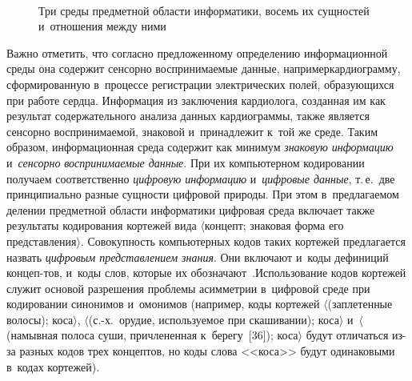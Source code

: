 \begin{multicols}{2}
  \begin{figure*}[b] %
  \vspace*{1pt}
\begin{center}
   \mbox{%
\epsfxsize=163mm
}

\vspace*{6pt}

{\small Три среды предметной области информатики, восемь их сущностей и~отношения 
между ними
  }
  \end{center}
  \end{figure*}
  
  Важно отметить, что согласно предложенному определению 
информационной среды она содержит сенсорно воспринимаемые данные, 
например\linebreak кардиограмму, сформированную в~процессе ре\-гист\-ра\-ции 
электрических полей, образующихся при работе сердца. Информация из 
заключения кардиолога, созданная им как результат \mbox{содержательного} анализа 
данных кардиограммы, также является сенсорно воспринимаемой, знаковой 
и~принадлежит к~той же среде. Таким образом, информационная среда 
содержит как минимум \textit{знаковую информацию} и~\textit{сенсорно} 
\textit{воспринимаемые данные}. При их компьютерном кодировании получаем 
соответственно \textit{цифровую информацию} и~\textit{цифровые данные}, т.\,е.\
 две принципиально разные сущности циф\-ро\-вой природы. При этом 
в~предлагаемом делении предметной об\-ласти информатики цифровая среда 
включает также результаты кодирования кортежей вида $\langle$концепт; 
знаковая форма его представления$\rangle$. Совокупность компьютерных 
кодов таких кортежей предлагается назвать \textit{цифровым представлением 
знания}. Они включают и~коды дефиниций концеп-\linebreak тов, и~коды слов, которые их 
обозначают~\cite{35-zac}.\linebreak Использование кодов кортежей служит основой 
разрешения проблемы асимметрии в~цифровой среде при кодировании 
синонимов и~омонимов (например, коды кортежей $\langle$(заплетенные 
волосы); коса$\rangle$, $\langle$(\mbox{с.-х.}\ орудие, используемое при скашивании); 
коса$\rangle$ и~$\langle$(намывная полоса суши, причлененная к~берегу~[36]); 
коса$\rangle$ будут отличаться из-за разных кодов трех концептов, но коды 
слова <<коса>> будут одинаковыми в~кодах кортежей).
  

\end{multicols}
